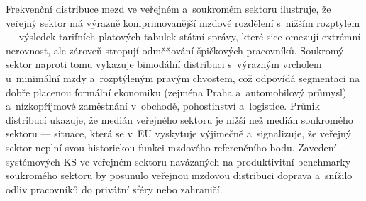 Frekvenční distribuce mezd ve veřejném a~soukromém sektoru ilustruje, že veřejný sektor má výrazně komprimovanější mzdové rozdělení s~nižším rozptylem --- výsledek tarifních platových tabulek státní správy, které sice omezují extrémní nerovnost, ale zároveň stropují odměňování špičkových pracovníků.
Soukromý sektor naproti tomu vykazuje bimodální distribuci s~výrazným vrcholem u~minimální mzdy a~rozptýleným pravým chvostem, což odpovídá segmentaci na dobře placenou formální ekonomiku (zejména Praha a~automobilový průmysl) a~nízkopříjmové zaměstnání v~obchodě, pohostinství a~logistice.
Průnik distribucí ukazuje, že medián veřejného sektoru je nižší než medián soukromého sektoru --- situace, která se v~\ac{EU} vyskytuje výjimečně a~signalizuje, že veřejný sektor neplní svou historickou funkci mzdového referenčního bodu.
Zavedení systémových \ac{KS} ve veřejném sektoru navázaných na produktivitní benchmarky soukromého sektoru by posunulo veřejnou mzdovou distribuci doprava a~snížilo odliv pracovníků do privátní sféry nebo zahraničí.


